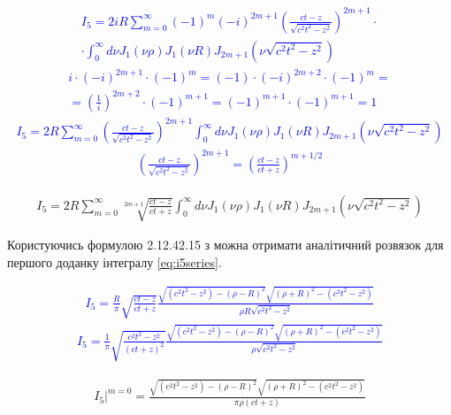 \textcolor{blue}{ \begin{equation*} \begin{aligned}
I_5 = 2 i R \sum_{m=0}^{\infty} (-1)^m (-i)^{2m+1}
\left( \frac{ct-z}{\sqrt{c^2t^2-z^2}} \right)^{2m+1} \cdot \\ 
\cdot \int_0^\infty d \nu J_1(\nu \rho) J_1(\nu R) 
J_{2m+1} \left( \nu \sqrt{c^2t^2 - z^2} \right)
\end{aligned}  \end{equation*} }
%
\textcolor{blue}{ \begin{equation*} \begin{aligned}
i \cdot (-i)^{2m+1} \cdot (-1)^m = (-1) \cdot (-i)^{2m+2} \cdot (-1)^m = \\
= \left( \frac{1}{i} \right)^{2m+2} \cdot (-1)^{m+1} = 
(-1)^{m+1} \cdot (-1)^{m+1} = 1
\end{aligned}  \end{equation*} }
%
\textcolor{blue}{ \begin{equation*} \begin{aligned}
I_5 = 2 R \sum_{m=0}^{\infty}
\left( \frac{ct-z}{\sqrt{c^2t^2-z^2}} \right)^{2m+1}
\int_0^\infty d \nu J_1(\nu \rho) J_1(\nu R) 
J_{2m+1} \left( \nu \sqrt{c^2t^2 - z^2} \right)
\end{aligned}  \end{equation*} }
%
\textcolor{blue}{ \begin{equation*} \begin{aligned}
\left( \frac{ct-z}{\sqrt{c^2t^2-z^2}} \right)^{2m+1} = 
\left( \frac{ct-z}{ct+z} \right)^{m+1/2}
\end{aligned}  \end{equation*} }

\begin{equation} \begin{aligned} \label{eq:i5series}
I_5 = 2 R \sum_{m=0}^{\infty}
\sqrt[2m+1]{\frac{ct-z}{ct+z}}
\int_0^\infty d \nu J_1(\nu \rho) J_1(\nu R) 
J_{2m+1} \left( \nu \sqrt{c^2t^2 - z^2} \right)
\end{aligned}  \end{equation}

Користуючись формулою 2.12.42.15 з \cite{imp:SpecFunc1983} можна отримати 
аналітичний розвязок для першого доданку інтегралу \eqref{eq:i5series}.

\textcolor{blue}{ \begin{equation*} \begin{aligned}
I_5 = \frac{R}{\pi}
\sqrt{\frac{ct-z}{ct+z}}
\frac{\sqrt{ (c^2t^2 - z^2) - (\rho - R)^2} 
\sqrt{(\rho + R)^2 - (c^2t^2 - z^2)}}
{\rho R \sqrt{c^2t^2 - z^2}}
\end{aligned}  \end{equation*} }
%
\textcolor{blue}{ \begin{equation*} \begin{aligned}
I_5 = \frac{1}{\pi}
\sqrt{\frac{c^2t^2-z^2}{(ct+z)^2}}
\frac{\sqrt{ (c^2t^2 - z^2) - (\rho - R)^2} 
\sqrt{(\rho + R)^2 - (c^2t^2 - z^2)}}
{\rho \sqrt{c^2t^2 - z^2}}
\end{aligned}  \end{equation*} }

\begin{equation} \begin{aligned} \label{eq:i50}
\left. I_5 \right|^{m=0} = \frac
{\sqrt{(c^2t^2 - z^2) - (\rho-R)^2}\sqrt{(\rho+R)^2 - (c^2t^2 - z^2)}}
{\pi \rho (ct+z)}
\end{aligned}  \end{equation}
